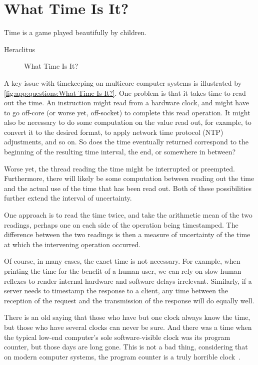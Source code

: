 
\section{What Time Is It?}
\label{sec:app:questions:What Time Is It?}
%
\epigraph{Time is a game played beautifully by children.}
	 {Heraclitus}

\begin{figure}
\centering
{}
\caption{What Time Is It?}
\end{figure}

A key issue with timekeeping on multicore computer systems is illustrated
by \cref{fig:app:questions:What Time Is It?}.
One problem is that it takes time to read out the time.
An instruction might read from a hardware clock, and might
have to go off-core (or worse yet, off-socket) to complete
this read operation.
It might also be necessary to do some computation on the value read out,
for example, to convert it to the desired format, to apply network time
protocol (NTP) adjustments, and so on.
So does the time eventually returned correspond to the beginning of
the resulting time interval, the end, or somewhere in between?

Worse yet, the thread reading the time might be interrupted or preempted.
Furthermore, there will likely be some computation between reading out
the time and the actual use of the time that has been read out.
Both of these possibilities further extend the interval of uncertainty.

One approach is to read the time twice, and take the arithmetic mean
of the two readings, perhaps one on each side of the operation being
timestamped.
The difference between the two readings is then a measure of uncertainty
of the time at which the intervening operation occurred.

Of course, in many cases, the exact time is not necessary.
For example, when printing the time for the benefit of a human user,
we can rely on slow human reflexes to render internal hardware and
software delays irrelevant.
Similarly, if a server needs to timestamp the response to a client, any
time between the reception of the request and the transmission of the
response will do equally well.

There is an old saying that those who have but one clock always
know the time, but those who have several clocks can never be sure.
And there was a time when the typical low-end computer's sole
software-visible clock was its program counter, but those days are
long gone.
This is not a bad thing, considering that on modern computer systems,
the program counter is a truly horrible
clock~\cite{PeterOkech2009InherentRandomness}.

